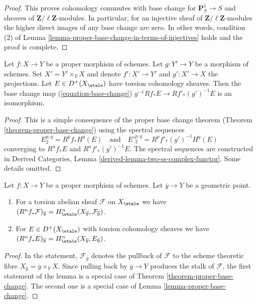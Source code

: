 \begin{proof}
\medskip\noindent
This proves cohomology commutes with base change for
$\mathbf{P}^1_S \to S$ and sheaves of $\mathbf{Z}/\ell\mathbf{Z}$-modules.
In particular, for an injective sheaf of $\mathbf{Z}/\ell\mathbf{Z}$-modules
the higher direct images of any base change are zero.
In other words, condition (2) of
Lemma \ref{lemma-proper-base-change-in-terms-of-injectives}
holds and the proof is complete.
\end{proof}

\begin{lemma}
\label{lemma-proper-base-change}
Let $f : X \to Y$ be a proper morphism of schemes. Let $g : Y' \to Y$ be
a morphism of schemes. Set $X' = Y' \times_Y X$ and denote
$f' : X' \to Y'$ and $g' : X' \to X$ the projections.
Let $E \in D^+(X_\etale)$ have torsion cohomology sheaves.
Then the base change map (\ref{equation-base-change})
$g^{-1}Rf_*E \to Rf'_*(g')^{-1}E$
is an isomorphism.
\end{lemma}

\begin{proof}
This is a simple consequence of the proper base change theorem
(Theorem \ref{theorem-proper-base-change}) using the spectral
sequences
$$
E_2^{p, q} = R^pf_*H^q(E)
\quad\text{and}\quad
{E'}_2^{p, q} = R^pf'_*(g')^{-1}H^q(E)
$$
converging to $R^nf_*E$ and $R^nf'_*(g')^{-1}E$.
The spectral sequences are constructed in
Derived Categories, Lemma \ref{derived-lemma-two-ss-complex-functor}.
Some details omitted.
\end{proof}

\begin{lemma}
\label{lemma-proper-base-change-stalk}
Let $f : X \to Y$ be a proper morphism of schemes. Let $\overline{y} \to Y$
be a geometric point.
\begin{enumerate}
\item For a torsion abelian sheaf $\mathcal{F}$ on $X_\etale$ we have
$(R^nf_*\mathcal{F})_{\overline{y}} =
H^n_\etale(X_{\overline{y}}, \mathcal{F}_{\overline{y}})$.
\item For $E \in D^+(X_\etale)$ with torsion cohomology sheaves we have
$(R^nf_*E)_{\overline{y}} = H^n_\etale(X_{\overline{y}}, E_{\overline{y}})$.
\end{enumerate}
\end{lemma}

\begin{proof}
In the statement, $\mathcal{F}_{\overline{y}}$ denotes the pullback
of $\mathcal{F}$ to the scheme theoretic fibre
$X_{\overline{y}} = \overline{y} \times_Y X$.
Since pulling back by $\overline{y} \to Y$ produces the
stalk of $\mathcal{F}$, the first statement of the lemma
is a special case of Theorem \ref{theorem-proper-base-change}.
The second one is a special case of Lemma \ref{lemma-proper-base-change}.
\end{proof}






